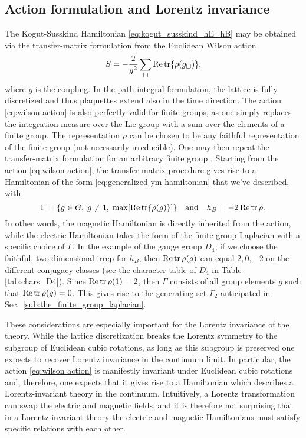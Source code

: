 \subsection{Action formulation and Lorentz invariance}%
\label{sub:action_formulation}


The Kogut-Susskind Hamiltonian \eqref{eq:kogut_susskind_hE_hB} may be obtained via the transfer-matrix formulation from the Euclidean Wilson action \cite{creutz1977transfermatrix,kogut1979introduction}
\begin{equation}
    \label{eq:wilson action}
    S = -\frac{2}{g^2} \sum_{\square} \Re \tr{\rho(g_\square)},
\end{equation}
where $g$ is the coupling.
In the path-integral formulation, the lattice is fully discretized and thus plaquettes extend also in the time direction.
The action \eqref{eq:wilson action} is also perfectly valid for finite groups, as one simply replaces the integration measure over the Lie group with a sum over the elements of a finite group.
The representation $\rho$ can be chosen to be any faithful representation of the finite group (not necessarily irreducible).
One may then repeat the transfer-matrix formulation for an arbitrary finite group \cite{harlow2018quantum}.
Starting from the action \eqref{eq:wilson action}, the transfer-matrix procedure gives rise to a Hamiltonian of the form \eqref{eq:generalized ym hamiltonian} that we've described, with
\begin{equation}
    \label{eq:lorentz invariance relations}
    \Gamma = \{g \in G,\; g \neq 1, \; \mathrm{max} \bqty{\Re \tr{\rho(g)}} \}
    \qand
    h_B=-2\Re\tr\rho.
\end{equation}
In other words, the magnetic Hamiltonian is directly inherited from the action, while the electric Hamiltonian takes the form of the finite-group Laplacian with a specific choice of $\Gamma$.
In the example of the gauge group $D_4$, if we choose the faithful, two-dimensional \ac{irrep} for $h_B$, then $\Re\tr\rho(g)$ can equal $2, 0, -2$ on the different conjugacy classes (see the character table of $D_4$ in Table \ref{tab:chars_D4}).
Since $\Re\tr\rho(1)=2$, then $\Gamma$ consists of all group elements $g$ such that $\Re\tr\rho(g)=0$.
This gives rise to the generating set $\Gamma_2$ anticipated in Sec.~\ref{sub:the_finite_group_laplacian}.

These considerations are especially important for the Lorentz invariance of the theory.
While the lattice discretization breaks the Lorentz symmetry to the subgroup of Euclidean cubic rotations, as long as this subgroup is preserved one expects to recover Lorentz invariance in the continuum limit.
In particular, the action \eqref{eq:wilson action} is manifestly invariant under Euclidean cubic rotations and, therefore, one expects that it gives rise to a  Hamiltonian which describes a Lorentz-invariant theory in the continuum.
Intuitively, a Lorentz transformation can swap the electric and magnetic fields, and it is therefore not surprising that in a Lorentz-invariant theory the electric and magnetic Hamiltonians must satisfy specific relations with each other.

